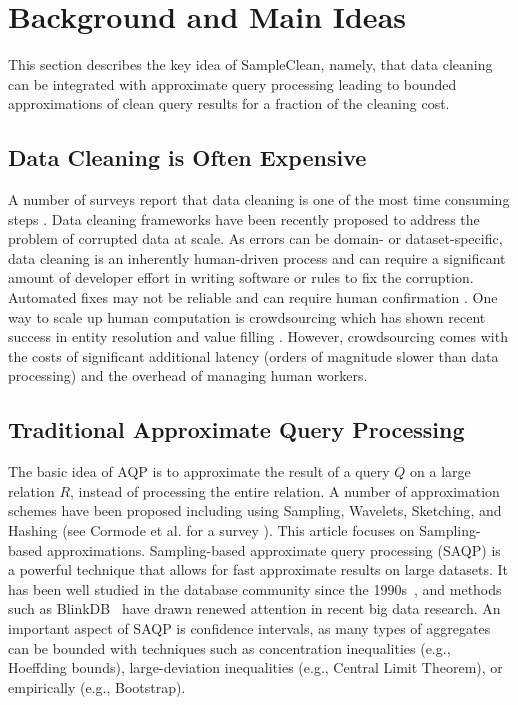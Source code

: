 \section{Background and Main Ideas}

This section describes the key idea of SampleClean, namely, that data cleaning can be integrated with approximate query processing leading to bounded approximations of clean query results for a fraction of the cleaning cost.

\subsection{Data Cleaning is Often Expensive}
A number of surveys report that data cleaning is one of the most time consuming steps \cite{kandel2012enterprise, nytimes}.
Data cleaning frameworks have been recently proposed to address the problem of corrupted data at scale\cite{khayyat2015bigdansing, chu2015katara, sampleclean}.
As errors can be domain- or dataset-specific, data cleaning is an inherently human-driven process and can require a significant amount of developer effort in writing software or rules to fix the corruption.
Automated fixes may not be reliable and can require human confirmation \cite{DBLP:journals/pvldb/YakoutENOI11}.
One way to scale up human computation is crowdsourcing which has shown recent success in entity resolution and value filling \cite{gokhale2014corleone, park2014crowdfill, sampleclean,chu2015katara}.
However, crowdsourcing comes with the costs of significant additional latency (orders of magnitude slower than data processing) and the overhead of managing human workers.

\subsection{Traditional Approximate Query Processing}
The basic idea of AQP is to approximate the result of a query $Q$ on a large relation $R$, instead of processing the entire relation.
A number of approximation schemes have been proposed including using Sampling, Wavelets, Sketching, and Hashing (see Cormode et al. for a survey \cite{DBLP:journals/ftdb/CormodeGHJ12}).
This article focuses on Sampling-based approximations.
Sampling-based approximate query processing (SAQP) is a powerful technique that allows for fast approximate results on large datasets. 
It has been well studied in the database community since the 1990s~\cite{DBLP:conf/sigmod/HellersteinHW97,DBLP:conf/sigmod/AcharyaGPR99,DBLP:conf/icde/OlkenR92, OlkenR86}, and methods such as BlinkDB~\cite{DBLP:conf/eurosys/AgarwalMPMMS13} have drawn renewed attention in recent big data research. 
An important aspect of SAQP is confidence intervals, as many types of aggregates can be bounded with techniques such as concentration inequalities (e.g., Hoeffding bounds), large-deviation inequalities (e.g., Central Limit Theorem), or empirically (e.g., Bootstrap). 

